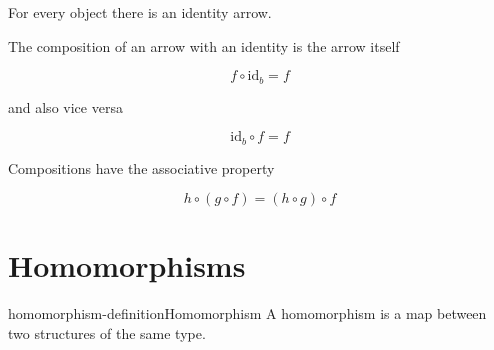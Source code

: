\documentclass[preview]{standalone}
\begin{document}

For every object there is an identity arrow.

\begin{center}
\end{center}

The composition of an arrow with an identity is the arrow itself

\begin{center}
\end{center}

\[
    f \circ \text{id}_b = f
\]

and also vice versa

\[
    \text{id}_b \circ f = f
\]


Compositions have the associative property

\begin{center}
\end{center}

\[
    h \circ (g \circ f) = (h \circ g) \circ f
\]

\section{Homomorphisms}

\begin{snippetdefinition}{homomorphism-definition}{Homomorphism}
    A homomorphism is a map between two structures of the same type.
\end{snippetdefinition}
\end{document}
